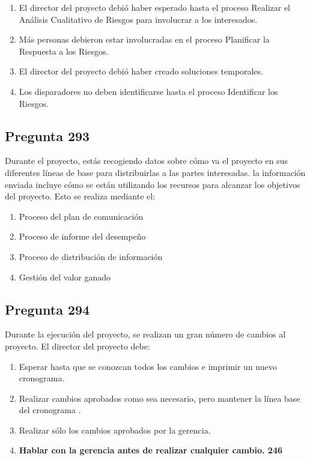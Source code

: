 \documentclass[11pt,a4paper]{article}
\begin{document}
\begin{enumerate}[label=\alph*)]
  \item El director del proyecto debió haber esperado hasta el proceso Realizar el Análisis Cualitativo de Riesgos para involucrar a los interesados.
  \item Más personas debieron estar involucradas en el proceso Planificar la Respuesta a los Riesgos.
  \item El director del proyecto debió haber creado soluciones temporales.
  \item Los disparadores no deben identificarse hasta el proceso Identificar los Riesgos.
\end{enumerate}

\subsection*{Pregunta 293}
Durante el proyecto, estás recogiendo datos sobre cómo va el proyecto en sus diferentes líneas de base para distribuirlas a las partes interesadas. la información enviada incluye cómo se están utilizando los recursos para alcanzar los objetivos del proyecto. Esto se realiza mediante el:

\begin{enumerate}[label=\alph*)]
  \item Proceso del plan de comunicación
  \item Proceso de informe del desempeño
  \item Proceso de distribución de información
  \item Gestión del valor ganado
\end{enumerate}

\subsection*{Pregunta 294}
Durante la ejecución del proyecto, se realizan un gran número de cambios al proyecto. El director del proyecto debe:

\begin{enumerate}[label=\alph*)]
  \item Esperar hasta que se conozcan todos los cambios e imprimir un nuevo cronograma.
  \item Realizar cambios aprobados como sea necesario, pero mantener la línea base del cronograma .
  \item Realizar sólo los cambios aprobados por la gerencia.
  \item \textbf{Hablar con la gerencia antes de realizar cualquier cambio. 246}
\end{enumerate}
\end{document}

